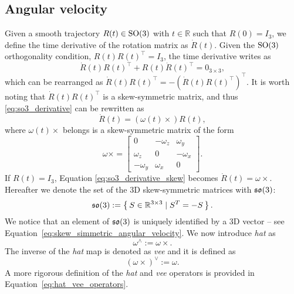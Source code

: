 \subsection{Angular velocity\label{sec:angular_velocity}}
Given a smooth trajectory $R(t) \in \mathrm{SO}(3)$ with $t \in \mathbb{R}$ such that $R(0) = I_3$, we define the time derivative of the rotation matrix as $\dot{R}(t)$.
Given the $\mathrm{SO}(3)$ orthogonality condition, $R(t) R(t)^\top = I_3$, the time derivative writes as
\begin{equation}
    \label{eq:so3_derivative}
    \dot{R}(t) R(t)^\top + R(t) \dot{R}(t)^\top = 0_{3\times3}, 
\end{equation}
which can be rearranged as $\dot{R}(t) R(t)^\top = -\left(  \dot{R}(t) R(t)^\top \right)^\top$. It is worth noting that $\dot{R}(t) R(t)^\top$ is a skew-symmetric matrix, and thus \eqref{eq:so3_derivative} can be rewritten as
\begin{equation}
    \label{eq:so3_derivative_skew}
    \dot{R}(t) =  (\omega(t) \times)  R(t),
\end{equation}
where $\omega(t) \times$ belongs is a skew-symmetric matrix of the form
\begin{equation}
\label{eq:skew_simmetric_angular_velocity}
    \omega \times = \begin{bmatrix}
        0 & -\omega_z & \omega_y \\
         \omega_z & 0 & -\omega_x \\
         -\omega_y & \omega_x & 0
    \end{bmatrix}.
\end{equation}
If $R(t) = I_3$, Equation \eqref{eq:so3_derivative_skew} becomes $\dot{R}(t) = \omega\times$. 
Hereafter we denote the set of the 3D skew-symmetric matrices with $\mathfrak{so}(3)$:
\begin{equation}
    \mathfrak{so}(3) :=  \left\{\, S \in \mathbb{R}^{3 \times 3}  \mid S^T = -S \,\right\}.
\end{equation}
We notice that an element of $\mathfrak{so}(3)$ is uniquely identified by a 3D vector -- see Equation~\eqref{eq:skew_simmetric_angular_velocity}. We now introduce \emph{hat} as 
\begin{equation}
    \omega ^\wedge := \omega \times.
\end{equation}
The inverse of the \emph{hat} map is denoted as \emph{vee} and it is defined as
\begin{equation}
    \left(\omega \times\right)^\vee := \omega.
\end{equation}
A more rigorous definition of the \emph{hat} and \emph{vee} operators is provided in Equation~\eqref{eq:hat_vee_operators}.


